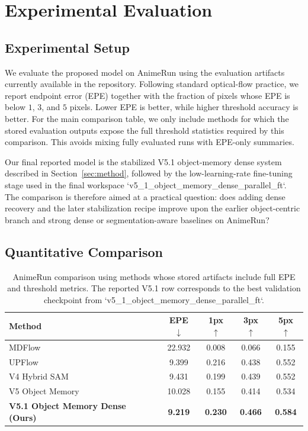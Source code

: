 \section{Experimental Evaluation}
\label{sec:eval}

\subsection{Experimental Setup}

We evaluate the proposed model on AnimeRun using the evaluation artifacts currently available in the repository. Following standard optical-flow practice, we report endpoint error (EPE) together with the fraction of pixels whose EPE is below $1$, $3$, and $5$ pixels. Lower EPE is better, while higher threshold accuracy is better. For the main comparison table, we only include methods for which the stored evaluation outputs expose the full threshold statistics required by this comparison. This avoids mixing fully evaluated runs with EPE-only summaries.

Our final reported model is the stabilized V5.1 object-memory dense system described in Section~\ref{sec:method}, followed by the low-learning-rate fine-tuning stage used in the final workspace `v5_1_object_memory_dense_parallel_ft`. The comparison is therefore aimed at a practical question: does adding dense recovery and the later stabilization recipe improve upon the earlier object-centric branch and strong dense or segmentation-aware baselines on AnimeRun?

\subsection{Quantitative Comparison}

\begin{table}[t]
\centering
\caption{AnimeRun comparison using methods whose stored artifacts include full EPE and threshold metrics. The reported V5.1 row corresponds to the best validation checkpoint from `v5_1_object_memory_dense_parallel_ft`.}
\label{tab:main_results}
\begin{tabular}{lcccc}
\hline
Method & EPE $\downarrow$ & 1px $\uparrow$ & 3px $\uparrow$ & 5px $\uparrow$ \\
\hline
MDFlow & 22.932 & 0.008 & 0.066 & 0.155 \\
UPFlow & 9.399 & 0.216 & 0.438 & 0.552 \\
V4 Hybrid SAM & 9.431 & 0.199 & 0.439 & 0.552 \\
V5 Object Memory & 10.028 & 0.155 & 0.414 & 0.534 \\
\hline
\textbf{V5.1 Object Memory Dense (Ours)} & \textbf{9.219} & \textbf{0.230} & \textbf{0.466} & \textbf{0.584} \\
\hline
\end{tabular}
\end{table}


